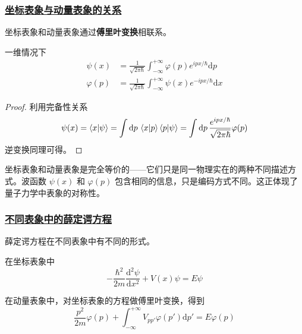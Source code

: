 \subsubsection{\protect\hyperlink{:}{坐标表象与动量表象的关系}}

坐标表象和动量表象通过\textbf{傅里叶变换}相联系。

\begin{theorem}[坐标-动量表象的傅里叶变换关系]
    一维情况下
    \begin{align}
        \psi(x) &= \frac{1}{\sqrt{2\pi\hbar}}\int_{-\infty}^{+\infty}\varphi(p)e^{ipx/\hbar}\mathrm{d}p \\
        \varphi(p) &= \frac{1}{\sqrt{2\pi\hbar}}\int_{-\infty}^{+\infty}\psi(x)e^{-ipx/\hbar}\mathrm{d}x
    \end{align}
\end{theorem}

\begin{proof}
    利用完备性关系
    \begin{equation}
        \psi(x) = \braket{x}{\psi} = \int\mathrm{d}p\,\braket{x}{p}\braket{p}{\psi} = \int\mathrm{d}p\,\frac{e^{ipx/\hbar}}{\sqrt{2\pi\hbar}}\varphi(p)
    \end{equation}
    逆变换同理可得。
\end{proof}

\begin{remark}
    坐标表象和动量表象是完全等价的——它们只是同一物理实在的两种不同描述方式。波函数 $\psi(x)$ 和 $\varphi(p)$ 包含相同的信息，只是编码方式不同。这正体现了量子力学中表象的对称性。
\end{remark}

\subsubsection{\protect\hyperlink{:}{不同表象中的薛定谔方程}}

薛定谔方程在不同表象中有不同的形式。

在坐标表象中
\begin{equation}
    -\frac{\hbar^2}{2m}\frac{\mathrm{d}^2\psi}{\mathrm{d}x^2} + V(x)\psi = E\psi
\end{equation}

在动量表象中，对坐标表象的方程做傅里叶变换，得到
\begin{equation}
    \frac{p^2}{2m}\varphi(p) + \int_{-\infty}^{+\infty}V_{pp'}\varphi(p')\mathrm{d}p' = E\varphi(p)
\end{equation}

